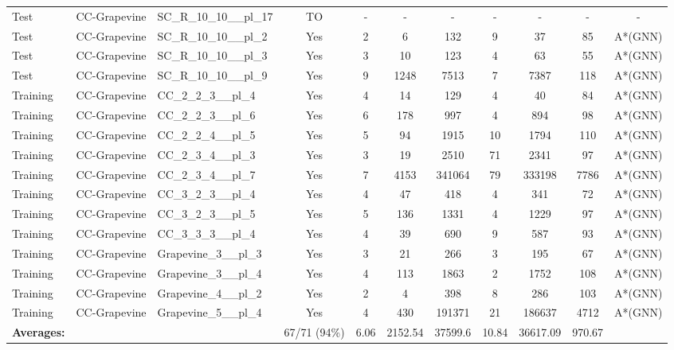 \documentclass{article}
\begin{document}
\begin{tabular}{lllcccccccc}
Test & CC-Grapevine & SC\_R\_10\_10\_\_pl\_17 & TO & - & - & - & - & - & - & - \\
Test & CC-Grapevine & SC\_R\_10\_10\_\_pl\_2 & Yes & 2 & 6 & 132 & 9 & 37 & 85 & A*(GNN) \\
Test & CC-Grapevine & SC\_R\_10\_10\_\_pl\_3 & Yes & 3 & 10 & 123 & 4 & 63 & 55 & A*(GNN) \\
Test & CC-Grapevine & SC\_R\_10\_10\_\_pl\_9 & Yes & 9 & 1248 & 7513 & 7 & 7387 & 118 & A*(GNN) \\
Training & CC-Grapevine & CC\_2\_2\_3\_\_pl\_4 & Yes & 4 & 14 & 129 & 4 & 40 & 84 & A*(GNN) \\
Training & CC-Grapevine & CC\_2\_2\_3\_\_pl\_6 & Yes & 6 & 178 & 997 & 4 & 894 & 98 & A*(GNN) \\
Training & CC-Grapevine & CC\_2\_2\_4\_\_pl\_5 & Yes & 5 & 94 & 1915 & 10 & 1794 & 110 & A*(GNN) \\
Training & CC-Grapevine & CC\_2\_3\_4\_\_pl\_3 & Yes & 3 & 19 & 2510 & 71 & 2341 & 97 & A*(GNN) \\
Training & CC-Grapevine & CC\_2\_3\_4\_\_pl\_7 & Yes & 7 & 4153 & 341064 & 79 & 333198 & 7786 & A*(GNN) \\
Training & CC-Grapevine & CC\_3\_2\_3\_\_pl\_4 & Yes & 4 & 47 & 418 & 4 & 341 & 72 & A*(GNN) \\
Training & CC-Grapevine & CC\_3\_2\_3\_\_pl\_5 & Yes & 5 & 136 & 1331 & 4 & 1229 & 97 & A*(GNN) \\
Training & CC-Grapevine & CC\_3\_3\_3\_\_pl\_4 & Yes & 4 & 39 & 690 & 9 & 587 & 93 & A*(GNN) \\
Training & CC-Grapevine & Grapevine\_3\_\_pl\_3 & Yes & 3 & 21 & 266 & 3 & 195 & 67 & A*(GNN) \\
Training & CC-Grapevine & Grapevine\_3\_\_pl\_4 & Yes & 4 & 113 & 1863 & 2 & 1752 & 108 & A*(GNN) \\
Training & CC-Grapevine & Grapevine\_4\_\_pl\_2 & Yes & 2 & 4 & 398 & 8 & 286 & 103 & A*(GNN) \\
Training & CC-Grapevine & Grapevine\_5\_\_pl\_4 & Yes & 4 & 430 & 191371 & 21 & 186637 & 4712 & A*(GNN) \\
\textbf{Averages:} & & & 67/71 (94\%) & 6.06 & 2152.54 & 37599.6 & 10.84 & 36617.09 & 970.67 & \\
\bottomrule
\end{tabular}
\newpage
\end{document}
